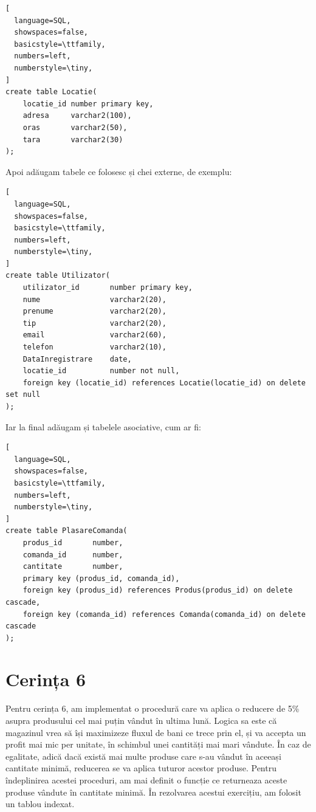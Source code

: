 \documentclass[12pt]{article}
\begin{document}
\begin{lstlisting}[
  language=SQL,
  showspaces=false,
  basicstyle=\ttfamily,
  numbers=left,
  numberstyle=\tiny,
]
create table Locatie(
	locatie_id number primary key,
	adresa     varchar2(100),
	oras       varchar2(50),
	tara	   varchar2(30)
);
\end{lstlisting}

\vspace{0.5em}

Apoi adăugam tabele ce folosesc și chei externe, de exemplu:

\begin{lstlisting}[
  language=SQL,
  showspaces=false,
  basicstyle=\ttfamily,
  numbers=left,
  numberstyle=\tiny,
]
create table Utilizator(
	utilizator_id		number primary key,
	nume				varchar2(20),
	prenume				varchar2(20),
	tip 				varchar2(20),
	email				varchar2(60),
	telefon				varchar2(10),
	DataInregistrare	date,
	locatie_id			number not null,
	foreign key (locatie_id) references Locatie(locatie_id) on delete set null
);
\end{lstlisting}

\vspace{0.5em}

Iar la final adăugam și tabelele asociative, cum ar fi:

\vspace{0.5em}

\begin{lstlisting}[
  language=SQL,
  showspaces=false,
  basicstyle=\ttfamily,
  numbers=left,
  numberstyle=\tiny,
]
create table PlasareComanda(
	produs_id		number,
	comanda_id		number,
	cantitate		number,
	primary key (produs_id, comanda_id),
	foreign key (produs_id) references Produs(produs_id) on delete cascade,
	foreign key (comanda_id) references Comanda(comanda_id) on delete cascade
);
\end{lstlisting}

\pagebreak

\section{Cerința 6}
Pentru cerința 6, am implementat o procedură care va aplica o reducere de 5\% asupra produsului
cel mai puțin vândut în ultima lună. Logica sa este că magazinul vrea să își maximizeze fluxul de bani 
ce trece prin el, și va accepta un profit mai mic per unitate, în schimbul unei cantități mai mari vândute.
În caz de egalitate, adică dacă există mai multe produse care s-au vândut în aceeași cantitate minimă,
reducerea se va aplica tuturor acestor produse.
Pentru îndeplinirea acestei proceduri, am mai definit o funcție ce returneaza aceste produse vândute în cantitate 
minimă. În rezolvarea acestui exercițiu, am folosit un tablou indexat.
\end{document}
